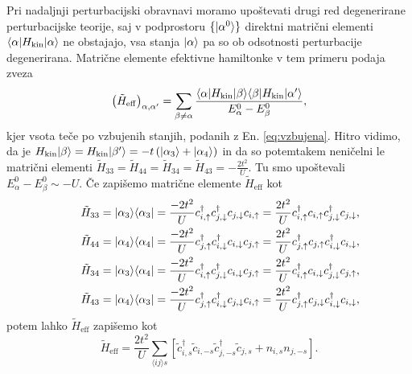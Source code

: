 \documentclass[10pt,a4paper]{article}
\begin{document}
Pri nadaljnji perturbacijski obravnavi moramo upoštevati drugi red degenerirane perturbacijske teorije, saj v podprostoru $\{ \vert\alpha^0\rangle\}$ direktni matrični elementi $\langle \alpha \vert H_\mathrm{kin} \vert\alpha\rangle$ ne obstajajo, vsa stanja $\vert\alpha\rangle$ pa so ob odsotnosti perturbacije degenerirana. 
Matrične elemente efektivne hamiltonke v tem primeru podaja zveza 
\begin{equation}
\left(\tilde{H}_\mathrm{eff}\right)_{\alpha, \alpha'}=\sum\limits_{\beta\neq\alpha}\frac{\langle \alpha \vert H_\mathrm{kin}\vert\beta\rangle\langle \beta \vert H_\mathrm{kin}\vert\alpha'\rangle}{E_\alpha^0 - E_\beta^0},
\end{equation}
kjer vsota teče po vzbujenih stanjih, podanih z En. \eqref{eq:vzbujena}. Hitro vidimo, da je 
$H_\mathrm{kin}\vert\beta\rangle=H_\mathrm{kin}\vert\beta'\rangle=-t\left(\vert\alpha_3\rangle+ \vert\alpha_4\rangle\right)$ in da so potemtakem neničelni le matrični elementi $\tilde{H}_{33}=\tilde{H}_{44}=\tilde{H}_{34}=\tilde{H}_{43}=-\frac{2t^2}{U}$. Tu smo upoštevali $E_\alpha^0- E_\beta^0 \sim -U$. Če zapišemo matrične elemente $\tilde{H}_\mathrm{eff}$ kot
\begin{equation}
\begin{aligned}\qquad
&\tilde{H}_{33}=\vert\alpha_3\rangle\langle \alpha_3 \vert=\frac{-2t^2}{U} c^\dagger_{i,\uparrow}c^\dagger_{j,\downarrow}c_{j,\downarrow}c_{i,\uparrow}= \frac{2t^2}{U}c^\dagger_{i,\uparrow}c_{i,\uparrow}c^\dagger_{j,\downarrow}c_{j,\downarrow},\\
&\tilde{H}_{44}=\vert\alpha_4\rangle\langle \alpha_4 \vert=\frac{-2t^2}{U} c^\dagger_{j,\uparrow}c^\dagger_{i,\downarrow}c_{i,\downarrow}c_{j,\uparrow}= \frac{2t^2}{U}c^\dagger_{j,\uparrow}c_{j,\uparrow}c^\dagger_{i,\downarrow}c_{i,\downarrow},\\
&\tilde{H}_{34}=\vert\alpha_3\rangle\langle \alpha_4 \vert=\frac{-2t^2}{U} c^\dagger_{i,\uparrow}c^\dagger_{j,\downarrow}c_{i,\downarrow}c_{j,\uparrow}= \frac{2t^2}{U}c^\dagger_{i,\uparrow}c_{i,\downarrow}c^\dagger_{j,\downarrow}c_{j,\uparrow},\\
&\tilde{H}_{43}=\vert\alpha_4\rangle\langle \alpha_3 \vert=\frac{-2t^2}{U} c^\dagger_{j,\uparrow}c^\dagger_{i,\downarrow}c_{j,\downarrow}c_{i,\uparrow}= \frac{2t^2}{U}c^\dagger_{j,\uparrow}c_{j,\downarrow}c^\dagger_{i,\downarrow}c_{i,\downarrow},
\end{aligned}
\end{equation}
potem lahko  $\tilde{H}_\mathrm{eff}$ zapišemo kot 
\begin{equation}\label{eq:efektivno}
\tilde{H}_\mathrm{eff} = \frac{2t^2}{U}\sum\limits_{\langle ij\rangle s } \left[\tilde{c}^\dagger_{i,s}\tilde{c}_{i,-s}\tilde{c}^\dagger_{j,-s}\tilde{c}_{j,s} + n_{i,s}n_{j,-s}  \right].
\end{equation}
\end{document}
